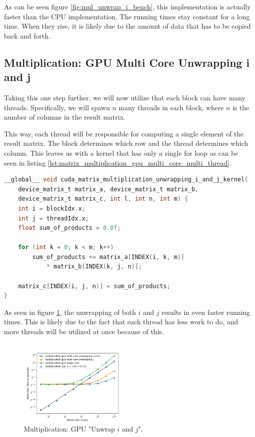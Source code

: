 As can be seen figure \ref{fig:mul_unwrap_i_bench}, this implementation is actually faster than the CPU implementation. The running times stay constant for a long time. When they rise, it is likely due to the amount of data that has to be copied back and forth.

\subsection{Multiplication: GPU Multi Core Unwrapping i and j}

Taking this one step further, we will now utilize that each block can have many threads. Specifically, we will spawn $n$ many threads in each block, where $n$ is the number of columns in the result matrix. 

This way, each thread will be responsible for computing a single element of the result matrix. The block determines which row and the thread determines which column. This leaves us with a kernel that has only a single for loop as can be seen in listing \ref{lst:matrix_multiplication_gpu_multi_core_multi_thread}. 

\begin{lstlisting}[language=C, caption={Multi Core "Unwrapping $i$ and $j$"}, label={lst:matrix_multiplication_gpu_multi_core_multi_thread}]
__global__ void cuda_matrix_multiplication_unwrapping_i_and_j_kernel(
    device_matrix_t matrix_a, device_matrix_t matrix_b,
    device_matrix_t matrix_c, int l, int n, int m) {
    int i = blockIdx.x;
    int j = threadIdx.x;
    float sum_of_products = 0.0f;

    for (int k = 0; k < m; k++)
        sum_of_products += matrix_a[INDEX(i, k, m)] 
            * matrix_b[INDEX(k, j, n)];

    matrix_c[INDEX(i, j, n)] = sum_of_products;
}
\end{lstlisting}

As seen in figure \ref{fig:mul_unwrap_i_and_j_bench}, the unwrapping of both $i$ and $j$ results in even faster running times. This is likely due to the fact that each thread has less work to do, and more threads will be utilized at once because of this.

\begin{figure}[h]
  \includegraphics[width=0.5\textwidth]{SavedBenchmarksAndDiagrams/Machine 2/Multiplication/GPU MC Unwrap i, j.png}
  \centering
  \caption{Multiplication: GPU "Unwrap $i$ and $j$".}
  \label{fig:mul_unwrap_i_and_j_bench}
\end{figure}

